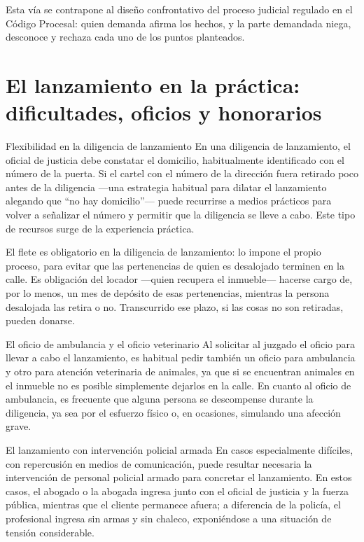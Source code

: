\documentclass[12pt,oneside]{book}
\begin{document}
Esta vía se contrapone al diseño confrontativo del proceso judicial regulado en el Código Procesal: quien demanda afirma los hechos, y la parte demandada niega, desconoce y rechaza cada uno de los puntos planteados.

\section{El lanzamiento en la práctica: dificultades, oficios y honorarios}

\begin{example}{Flexibilidad en la diligencia de lanzamiento}
En una diligencia de lanzamiento, el oficial de justicia debe constatar el domicilio, habitualmente identificado con el número de la puerta. Si el cartel con el número de la dirección fuera retirado poco antes de la diligencia —una estrategia habitual para dilatar el lanzamiento alegando que ``no hay domicilio''— puede recurrirse a medios prácticos para volver a señalizar el número y permitir que la diligencia se lleve a cabo. Este tipo de recursos surge de la experiencia práctica.
\end{example}

\begin{important}
El flete es obligatorio en la diligencia de lanzamiento: lo impone el propio proceso, para evitar que las pertenencias de quien es desalojado terminen en la calle. Es obligación del locador —quien recupera el inmueble— hacerse cargo de, por lo menos, un mes de depósito de esas pertenencias, mientras la persona desalojada las retira o no. Transcurrido ese plazo, si las cosas no son retiradas, pueden donarse.
\end{important}

\begin{example}{El oficio de ambulancia y el oficio veterinario}
Al solicitar al juzgado el oficio para llevar a cabo el lanzamiento, es habitual pedir también un oficio para ambulancia y otro para atención veterinaria de animales, ya que si se encuentran animales en el inmueble no es posible simplemente dejarlos en la calle. En cuanto al oficio de ambulancia, es frecuente que alguna persona se descompense durante la diligencia, ya sea por el esfuerzo físico o, en ocasiones, simulando una afección grave.
\end{example}

\begin{example}{El lanzamiento con intervención policial armada}
En casos especialmente difíciles, con repercusión en medios de comunicación, puede resultar necesaria la intervención de personal policial armado para concretar el lanzamiento. En estos casos, el abogado o la abogada ingresa junto con el oficial de justicia y la fuerza pública, mientras que el cliente permanece afuera; a diferencia de la policía, el profesional ingresa sin armas y sin chaleco, exponiéndose a una situación de tensión considerable.
\end{example}
\end{document}
